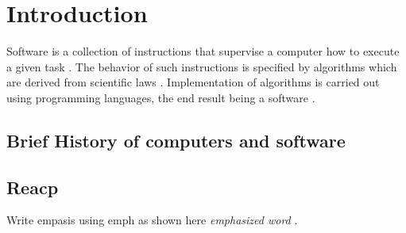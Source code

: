 \chapter{Introduction}
\label{ch:intro}
Software is a collection of instructions that supervise a computer how to execute a given task \citep{enwiki:1056292826}. The behavior of such instructions is specified by algorithms which are derived from scientific laws \citep{wolfram1984computer}.  Implementation of algorithms is carried out using programming languages, the end result being a software \citep{enwiki:1055624679, enwiki:1055665216}. 


\section{Brief History of computers and software}

%
%
\section{Reacp}
\label{sec:intro:reacp}
{}
Write empasis using emph as shown here \emph{emphasized word} .


